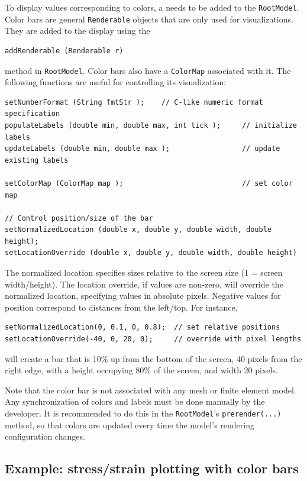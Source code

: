 To display values corresponding to colors, a 
 needs to be added to the 
{\tt RootModel}.  Color bars are general {\tt Renderable} objects that are
only used for visualizations.  They are added to the display using the
\begin{lstlisting}[]
addRenderable (Renderable r)
\end{lstlisting}
method in {\tt RootModel}.  Color bars also have a {\tt ColorMap} associated
with it.  The following functions are useful for controlling its visualization:
\begin{lstlisting}[]
setNumberFormat (String fmtStr );    // C-like numeric format specification
populateLabels (double min, double max, int tick );     // initialize labels
updateLabels (double min, double max );                 // update existing labels

setColorMap (ColorMap map );                            // set color map

// Control position/size of the bar
setNormalizedLocation (double x, double y, double width, double height);
setLocationOverride (double x, double y, double width, double height)
\end{lstlisting}
The normalized location specifies sizes relative to the screen size 
(1 = screen width/height).  The location override, if values are non-zero,
will override the normalized location, specifying values in absolute pixels.
Negative values for position correspond to distances from the left/top.
For instance,
\begin{lstlisting}[]
setNormalizedLocation(0, 0.1, 0, 0.8);  // set relative positions
setLocationOverride(-40, 0, 20, 0);     // override with pixel lengths
\end{lstlisting}
will create a bar that is 10\% up from the bottom of the screen, 40 pixels from
the right edge, with a height occupying 80\% of the screen, and width 20 pixels.

Note that the color bar is not associated with any mesh or finite element model.
Any synchronization of colors and labels must be done manually by the developer.
It is recommended to do this in the {\tt RootModel}'s {\tt prerender(...)} method,
so that colors are updated every time the model's rendering configuration changes.

\subsection{Example: stress/strain plotting with color bars}

